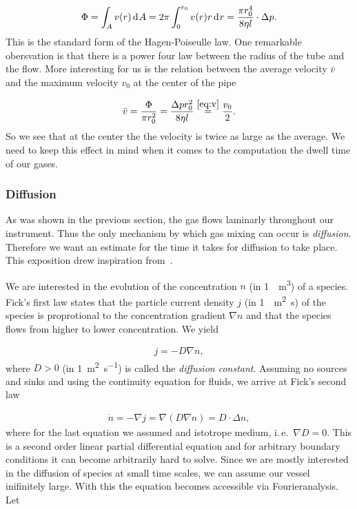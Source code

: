 \begin{align*}
  \Phi = \int_A v(r) \d[A] = 2\pi \int_0^{r_0} v(r)r \d[r] = \frac{\pi
  r_0^4}{8\eta l} \cdot \Delta p.
\end{align*}
This is the standard form of the Hagen-Poiseulle law. One remarkable
obersvation is that there is a power four law between the radius of
the tube and the flow. More interesting for us is the relation between
the average velocity $\bar v$ and the maximum velocity $v_0$ at the
center of the pipe

\begin{align*}
  \bar v = \frac{\Phi}{\pi r_0^2} = \frac{\Delta p r_0^2}{8\eta l} \stackrel{\eqref{eq:v}}{=} \frac{v_0}{2}.
\end{align*}
So we see that at the center the the velocity is twice as large as the
average. We need to keep this effect in mind when it comes to the
computation the dwell time of our gases.

\subsubsection{Diffusion}
\label{sec:diffusion}

As was shown in the previous section, the gas flows laminarly
throughout our instrument. Thus the only mechanism by which gas mixing
can occur is \emph{diffusion}. Therefore we want an estimate for the
time it takes for diffusion to take place. This exposition drew
inspiration from~\cite{fluid}.

We are interested in the evolution of the concentration $n$ (in
\SI{1}{\per\cubic\meter}) of a species. Fick's first law states that the
particle current density $j$ (in \SI{1}{\per\square\meter\second}) of the
species is proprotional to the concentration gradient $\nabla n$ and
that the species flows from higher to lower concentration. We yield

\begin{align*}
  j = - D \nabla n,
\end{align*}
where $D > 0$ (in \SI{1}{\square\meter\per\second}) is called the
\emph{diffusion constant}. Assuming no sources and sinks and using the
continuity equation for fluids, we arrive at Fick's second law

\begin{align*}
  \dot n = - \nabla j = \nabla (D \nabla n) = D \cdot \Delta n,
\end{align*}
where for the last equation we assumed and istotrope medium, i.\,e.\
$\nabla D = 0$. This is a second order linear partial differential
equation and for arbitrary boundary conditions it can become
arbitrarily hard to solve. Since we are mostly interested in the
diffusion of species at small time scales, we can assume our vessel
inifinitely large. With this the equation becomes accessible via
Fourieranalysis. Let

